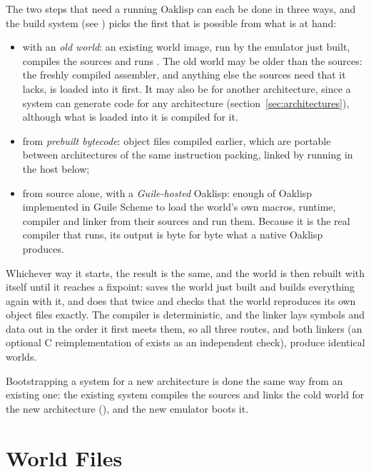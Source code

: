 The two steps that need a running Oaklisp can each be done in three
ways, and the build system (see ) picks the first that
is possible from what is at hand:
\begin{itemize}
\item with an \emph{old world}: an existing world image, run by the
  emulator just built, compiles the sources and runs .
  The old world may be older than the sources: the freshly compiled
  assembler, and anything else the sources need that it lacks, is
  loaded into it first.  It may also be for another architecture,
  since a system can generate code for any architecture
  (section~\ref{sec:architectures}), although what is loaded into it
  is compiled for it.
\item from \emph{prebuilt bytecode}: object files compiled earlier,
  which are portable between architectures of the same instruction
  packing, linked by  running in the host below;
\item from source alone, with a \emph{Guile-hosted} Oaklisp: enough
  of Oaklisp implemented in Guile Scheme to load the world's own
  macros, runtime, compiler and linker from their sources and run
  them.  Because it is the real compiler that runs, its output is byte
  for byte what a native Oaklisp produces.
\end{itemize}
Whichever way it starts, the result is the same, and the world is
then rebuilt with itself until it reaches a fixpoint:  saves the world just built and builds everything again
with it, and  does that twice and checks that the
world reproduces its own object files exactly.  The compiler is
deterministic, and the linker lays symbols and data out in the order
it first meets them, so all three routes, and both linkers (an
optional C reimplementation of  exists as an independent
check), produce identical worlds.

Bootstrapping a system for a new architecture is done the same way
from an existing one: the existing system compiles the sources and
links the cold world for the new architecture (), and
the new emulator boots it.

\section{World Files} \label{sec:worldfiles}

